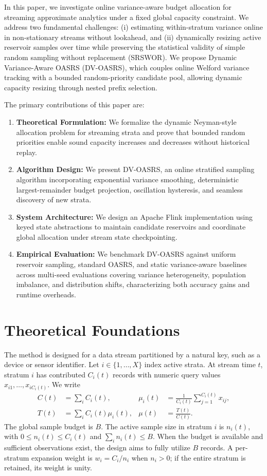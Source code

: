\documentclass[conference]{IEEEtran}
\begin{document}
In this paper, we investigate online variance-aware budget allocation for streaming approximate analytics under a fixed global capacity constraint. We address two fundamental challenges: (i) estimating within-stratum variance online in non-stationary streams without lookahead, and (ii) dynamically resizing active reservoir samples over time while preserving the statistical validity of simple random sampling without replacement (SRSWOR). We propose Dynamic Variance-Aware OASRS (DV-OASRS), which couples online Welford variance tracking with a bounded random-priority candidate pool, allowing dynamic capacity resizing through nested prefix selection.

The primary contributions of this paper are:
\begin{enumerate}
    \item \textbf{Theoretical Formulation:} We formalize the dynamic Neyman-style allocation problem for streaming strata and prove that bounded random priorities enable sound capacity increases and decreases without historical replay.
    \item \textbf{Algorithm Design:} We present DV-OASRS, an online stratified sampling algorithm incorporating exponential variance smoothing, deterministic largest-remainder budget projection, oscillation hysteresis, and seamless discovery of new strata.
    \item \textbf{System Architecture:} We design an Apache Flink implementation using keyed state abstractions to maintain candidate reservoirs and coordinate global allocation under stream state checkpointing.
    \item \textbf{Empirical Evaluation:} We benchmark DV-OASRS against uniform reservoir sampling, standard OASRS, and static variance-aware baselines across multi-seed evaluations covering variance heterogeneity, population imbalance, and distribution shifts, characterizing both accuracy gains and runtime overheads.
\end{enumerate}


\section{Theoretical Foundations}

The method is designed for a data stream partitioned by a natural key, such as a device or sensor identifier. Let $i\in\{1,\ldots,X\}$ index active strata. At stream time $t$, stratum $i$ has contributed $C_i(t)$ records with numeric query values $x_{i1},\ldots,x_{iC_i(t)}$. We write
\begin{align}
 C(t) &= \sum_i C_i(t), &
 \mu_i(t) &= \frac{1}{C_i(t)}\sum_{j=1}^{C_i(t)}x_{ij},\\
 T(t) &= \sum_i C_i(t)\mu_i(t), &
 \mu(t) &= \frac{T(t)}{C(t)}.
\end{align}
The global sample budget is $B$. The active sample size in stratum $i$ is $n_i(t)$, with $0\le n_i(t)\le C_i(t)$ and $\sum_i n_i(t)\le B$. When the budget is available and sufficient observations exist, the design aims to fully utilize $B$ records. A per-stratum expansion weight is $w_i=C_i/n_i$ when $n_i>0$; if the entire stratum is retained, its weight is unity.
\end{document}
